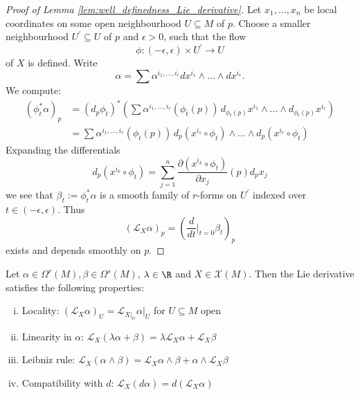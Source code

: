 \begin{proof}[Proof of Lemma \ref{lem:well_definedness_Lie_derivative}]
    Let $x_1,\ldots,x_n$ be local coordinates on some open neighbourhood $U \subseteq M$ of $p$. Choose a smaller neighbourhood $U^\prime \subseteq U$ of $p$ and $\epsilon > 0$, such that the flow
    \[
    \phi \colon (-\epsilon,\epsilon) \times U^\prime \to U
    \]
    of $X$ is defined. Write
    \[
        \alpha = \sum \alpha^{i_1,\ldots,i_r}dx^{i_1} \wedge \ldots \wedge dx^{i_r}.
    \]
    We compute:
    \begin{align*}
        (\phi_t^\ast\alpha)_p &= (d_p\phi_t)^\ast\left(\sum\alpha^{i_1,\ldots,i_r}(\phi_t(p))\,d_{\phi_t(p)}x^{i_1} \wedge \ldots \wedge d_{\phi_t(p)}x^{i_r}\right)\\
        &= \sum \alpha^{i_1,\ldots,i_r}(\phi_t(p)) \,d_p(x^{i_1} \circ \phi_t) \wedge \ldots \wedge d_p(x^{i_r} \circ \phi_t)
    \end{align*}
    Expanding the differentials 
    \[
        d_p(x^{i_k} \circ \phi_t) = \sum_{j=1}^n \frac{\partial(x^{i_k} \circ \phi_t)}{\partial x_j}(p) d_px_j
    \]
    we see that $\beta_t := \phi_t^\ast \alpha$ is a smooth family of $r$-forms on $U^\prime$ indexed over $t \in (-\epsilon,\epsilon)$. Thus
    \[
    (\mathcal{L}_X \alpha)_p = \left(\frac{d}{dt}\bigg|_{t=0} \beta_t\right)_p
    \]
    exists and depends smoothly on $p$.

\end{proof}

\begin{proposition}
    \label{prop:lie_derivative_properties}
    Let $\alpha \in \Omega^r(M), \beta \in \Omega^s(M)$, $\lambda \in \R$ and $X \in \mathscr{X}(M)$. Then the Lie derivative satisfies the following properties:
    \begin{enumerate}[(i)]
        \item Locality: $(\mathcal{L}_X \alpha)_U = \mathcal{L}_{X|_U} \alpha|_U$ for $U \subseteq M$ open
        \item Linearity in $\alpha$: $\mathcal{L}_X(\lambda \alpha + \beta) = \lambda \mathcal{L}_X \alpha + \mathcal{L}_X \beta$
        \item Leibniz rule: $\mathcal{L}_X(\alpha \wedge \beta) = \mathcal{L}_X \alpha \wedge \beta + \alpha \wedge \mathcal{L}_X \beta$
        \item Compatibility with $d$: $\mathcal{L}_X(d\alpha) = d(\mathcal{L}_X\alpha)$
    \end{enumerate}
\end{proposition}

